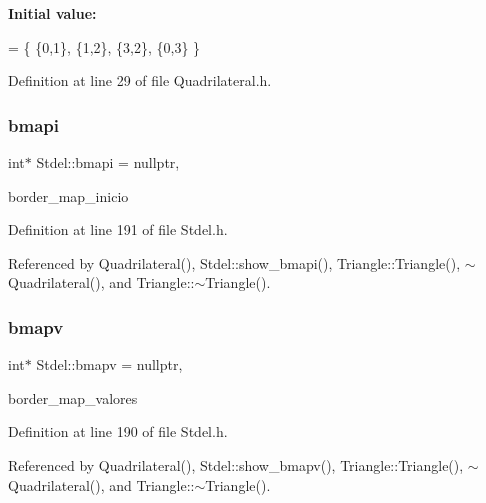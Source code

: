 {\bfseries Initial value\+:}
\begin{DoxyCode}
=
  \{ \{0,1\},
    \{1,2\},
    \{3,2\},
    \{0,3\}
  \}
\end{DoxyCode}


Definition at line 29 of file Quadrilateral.\+h.

\mbox{\label{classStdel_a8b082d27e5c3cab7ad2045b464af0fd9}} 
\subsubsection{\texorpdfstring{bmapi}{bmapi}}
{\footnotesize\ttfamily int$\ast$ Stdel\+::bmapi = nullptr\hspace{0.3cm}{\ttfamily [protected]}, {\ttfamily [inherited]}}



border\+\_\+map\+\_\+inicio 



Definition at line 191 of file Stdel.\+h.



Referenced by Quadrilateral(), Stdel\+::show\+\_\+bmapi(), Triangle\+::\+Triangle(), $\sim$\+Quadrilateral(), and Triangle\+::$\sim$\+Triangle().

\mbox{\label{classStdel_ac3cd818c98aa400279f28c22c8e0abaa}} 
\subsubsection{\texorpdfstring{bmapv}{bmapv}}
{\footnotesize\ttfamily int$\ast$ Stdel\+::bmapv = nullptr\hspace{0.3cm}{\ttfamily [protected]}, {\ttfamily [inherited]}}



border\+\_\+map\+\_\+valores 



Definition at line 190 of file Stdel.\+h.



Referenced by Quadrilateral(), Stdel\+::show\+\_\+bmapv(), Triangle\+::\+Triangle(), $\sim$\+Quadrilateral(), and Triangle\+::$\sim$\+Triangle().

\mbox{\label{classStdel_a61f02fa483b00cb98ff5c8d951068211}} 

